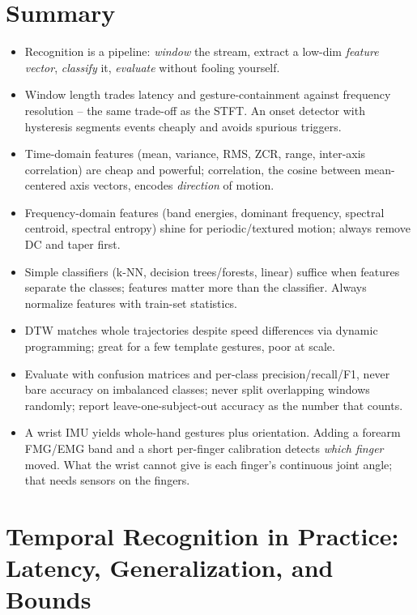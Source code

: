 \section{Summary}
\label{ch38:summary}

\begin{itemize}
  \item Recognition is a pipeline: \emph{window} the stream, extract a low-dim
        \emph{feature vector}, \emph{classify} it, \emph{evaluate} without fooling
        yourself.
  \item Window length trades latency and gesture-containment against frequency
        resolution -- the same trade-off as the STFT. An onset detector with
        hysteresis segments events cheaply and avoids spurious triggers.
  \item Time-domain features (mean, variance, RMS, ZCR, range, inter-axis
        correlation) are cheap and powerful; correlation, the cosine between
        mean-centered axis vectors, encodes \emph{direction} of motion.
  \item Frequency-domain features (band energies, dominant frequency, spectral
        centroid, spectral entropy) shine for periodic/textured motion; always
        remove DC and taper first.
  \item Simple classifiers (k-NN, decision trees/forests, linear) suffice when
        features separate the classes; features matter more than the classifier.
        Always normalize features with train-set statistics.
  \item DTW matches whole trajectories despite speed differences via dynamic
        programming; great for a few template gestures, poor at scale.
  \item Evaluate with confusion matrices and per-class precision/recall/F1, never
        bare accuracy on imbalanced classes; never split overlapping windows
        randomly; report leave-one-subject-out accuracy as the number that counts.
  \item A wrist IMU yields whole-hand gestures plus orientation. Adding a forearm
        FMG/EMG band and a short per-finger calibration detects \emph{which finger}
        moved. What the wrist cannot give is each finger's continuous joint angle;
        that needs sensors on the fingers.
\end{itemize}

\section{Temporal Recognition in Practice: Latency, Generalization, and Bounds}
\label{ch38:capabilities-limits}

